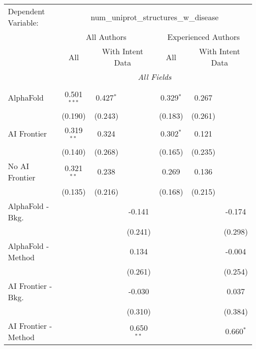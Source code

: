\begingroup
\centering
\begin{tabular}{lcccccc}
   \tabularnewline \midrule \midrule
   Dependent Variable: & \multicolumn{6}{c}{num\_uniprot\_structures\_w\_disease}\\
 & \multicolumn{3}{c}{All Authors} & \multicolumn{3}{c}{Experienced Authors} \\
\cmidrule(lr){2-4} \cmidrule(lr){5-7}
 & \multicolumn{1}{c}{All} & \multicolumn{2}{c}{With Intent Data} & \multicolumn{1}{c}{All} & \multicolumn{2}{c}{With Intent Data} \\
\cmidrule(lr){2-2} \cmidrule(lr){3-4} \cmidrule(lr){5-5} \cmidrule(lr){6-7}
 & \multicolumn{6}{c}{\textit{All Fields}} \\ \\
   AlphaFold               & 0.501$^{***}$ & 0.427$^{*}$ &               & 0.329$^{*}$ & 0.267   &   \\   
                           & (0.190)       & (0.243)     &               & (0.183)     & (0.261) &   \\   
   AI Frontier             & 0.319$^{**}$  & 0.324       &               & 0.302$^{*}$ & 0.121   &   \\   
                           & (0.140)       & (0.268)     &               & (0.165)     & (0.235) &   \\   
   No AI Frontier          & 0.321$^{**}$  & 0.238       &               & 0.269       & 0.136   &   \\   
                           & (0.135)       & (0.216)     &               & (0.168)     & (0.215) &   \\   
   AlphaFold - Bkg.        &               &             & -0.141        &             &         & -0.174\\   
                           &               &             & (0.241)       &             &         & (0.298)\\   
   AlphaFold - Method      &               &             & 0.134         &             &         & -0.004\\   
                           &               &             & (0.261)       &             &         & (0.254)\\   
   AI Frontier - Bkg.      &               &             & -0.030        &             &         & 0.037\\   
                           &               &             & (0.310)       &             &         & (0.384)\\   
   AI Frontier - Method    &               &             & 0.650$^{**}$  &             &         & 0.660$^{*}$\\   

\end{tabular}
